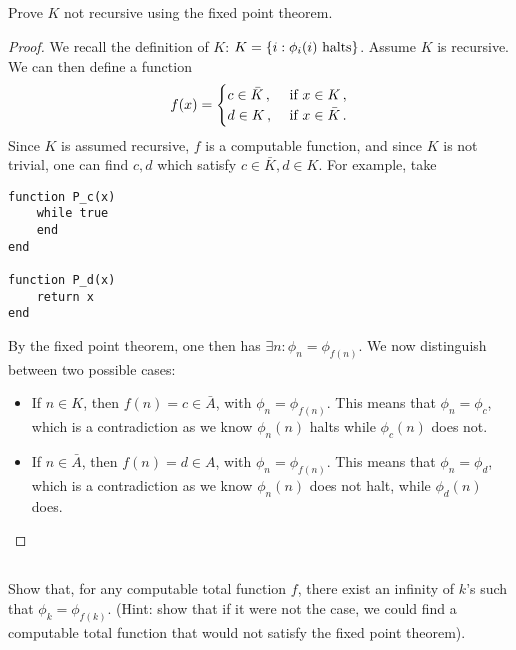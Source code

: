 \subsection{} %
Prove \(K\) not recursive using the fixed point theorem.

\begin{solution}
\begin{proof}
We recall the definition of \(K\):
\(K = \{i : \phi_i(i) \textnormal{ halts}\}\).
Assume \(K\) is recursive.
We can then define a function
\[
f(x) = \begin{cases} c \in \bar{K}\,, & \textnormal{ if } x \in K\,,\\
d \in K\,, & \textnormal{ if } x \in \bar{K}\,. \end{cases}
\]
Since \(K\) is assumed recursive,
\(f\) is a computable function,
and since \(K\) is not trivial,
one can find \(c, d\) which satisfy \(c \in \bar{K}, d \in K\).
For example, take
\begin{verbatim}
function P_c(x)
	while true
	end
end

function P_d(x)
	return x
end
\end{verbatim}
By the fixed point theorem, one then has
\(\exists n : \phi_n = \phi_{f(n)}\).
We now distinguish between two possible cases:
\begin{itemize}
	\item If \(n \in K\), then \(f(n) = c \in \bar{A}\),
	with \(\phi_n = \phi_{f(n)}\).
	This means that \(\phi_n = \phi_c\),
	which is a contradiction as we know \(\phi_n(n)\) halts
	while \(\phi_c(n)\) does not.
	\item If \(n \in \bar{A}\), then \(f(n) = d \in A\),
	with \(\phi_n = \phi_{f(n)}\).
	This means that \(\phi_n = \phi_d\),
	which is a contradiction as we know \(\phi_n(n)\) does not halt,
	while \(\phi_d(n)\) does.
\end{itemize}
\end{proof}
\end{solution}

\subsection{} %
Show that, for any computable total function \(f\),
there exist an infinity of \(k\)'s such that \(\phi_k = \phi_{f(k)}\).
(Hint: show that if it were not the case,
we could find a computable total function
that would not satisfy the fixed point theorem).

